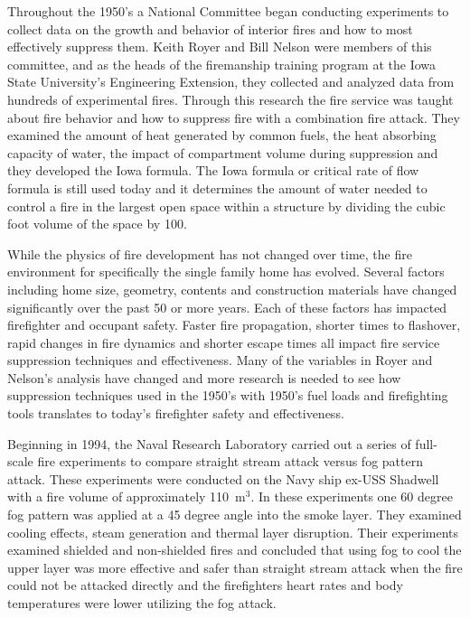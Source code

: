 \documentclass{article}
\begin{document}
Throughout the 1950’s a National Committee began conducting experiments to collect data on the growth and behavior of interior fires and how to most effectively suppress them. Keith Royer and Bill Nelson were members of this committee, and as the heads of the firemanship training program at the Iowa State University’s Engineering Extension, they collected and analyzed data from hundreds of experimental fires. Through this research the fire service was taught about fire behavior and how to suppress fire with a combination fire attack. They examined the amount of heat generated by common fuels, the heat absorbing capacity of water, the impact of compartment volume during suppression and they developed the Iowa formula. The Iowa formula or critical rate of flow formula is still used today and it determines the amount of water needed to control a fire in the largest open space within a structure by dividing the cubic foot volume of the space by 100.

While the physics of fire development has not changed over time, the fire environment for specifically the single family home has evolved. Several factors including home size, geometry, contents and construction materials have changed significantly over the past 50 or more years. Each of these factors has impacted firefighter and occupant safety. Faster fire propagation, shorter times to flashover, rapid changes in fire dynamics and shorter escape times all impact fire service suppression techniques and effectiveness. Many of the variables in Royer and Nelson’s analysis have changed and more research is needed to see how suppression techniques used in the 1950’s with 1950’s fuel loads and firefighting tools translates to today’s firefighter safety and effectiveness.

Beginning in 1994, the Naval Research Laboratory carried out a series of full-scale fire experiments to compare straight stream attack versus fog pattern attack. These experiments were conducted on the Navy ship ex-USS Shadwell with a fire volume of approximately 110~m$^3$. In these experiments one 60 degree fog pattern was applied at a 45 degree angle into the smoke layer. They examined cooling effects, steam generation and thermal layer disruption. Their experiments examined shielded and non-shielded fires and concluded that using fog to cool the upper layer was more effective and safer than straight stream attack when the fire could not be attacked directly and the firefighters heart rates and body temperatures were lower utilizing the fog attack.
\end{document}
